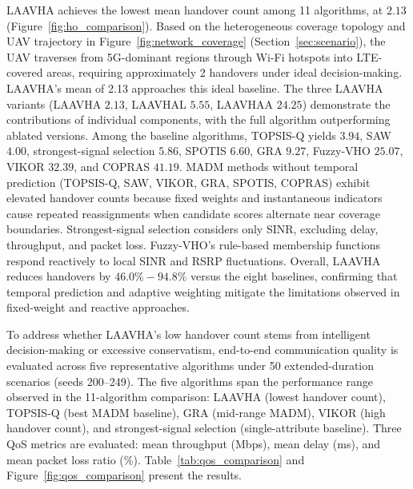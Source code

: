 \documentclass[preprint,12pt]{elsarticle}
\begin{document}
LAAVHA achieves the lowest mean handover count among 11 algorithms, at $2.13$ (Figure~\ref{fig:ho_comparison}). Based on the heterogeneous coverage topology and UAV trajectory in Figure~\ref{fig:network_coverage} (Section~\ref{sec:scenario}), the UAV traverses from 5G-dominant regions through Wi-Fi hotspots into LTE-covered areas, requiring approximately 2 handovers under ideal decision-making. LAAVHA's mean of 2.13 approaches this ideal baseline. The three LAAVHA variants (LAAVHA $2.13$, LAAVHAL $5.55$, LAAVHAA $24.25$) demonstrate the contributions of individual components, with the full algorithm outperforming ablated versions. Among the baseline algorithms, TOPSIS-Q yields $3.94$, SAW $4.00$, strongest-signal selection $5.86$, SPOTIS $6.60$, GRA $9.27$, Fuzzy-VHO $25.07$, VIKOR $32.39$, and COPRAS $41.19$. MADM methods without temporal prediction (TOPSIS-Q, SAW, VIKOR, GRA, SPOTIS, COPRAS) exhibit elevated handover counts because fixed weights and instantaneous indicators cause repeated reassignments when candidate scores alternate near coverage boundaries. Strongest-signal selection considers only SINR, excluding delay, throughput, and packet loss. Fuzzy-VHO's rule-based membership functions respond reactively to local SINR and RSRP fluctuations. Overall, LAAVHA reduces handovers by $46.0\%-94.8\%$ versus the eight baselines, confirming that temporal prediction and adaptive weighting mitigate the limitations observed in fixed-weight and reactive approaches.

To address whether LAAVHA's low handover count stems from intelligent decision-making or excessive conservatism, end-to-end communication quality is evaluated across five representative algorithms under 50 extended-duration scenarios (seeds 200--249). The five algorithms span the performance range observed in the 11-algorithm comparison: LAAVHA (lowest handover count), TOPSIS-Q (best MADM baseline), GRA (mid-range MADM), VIKOR (high handover count), and strongest-signal selection (single-attribute baseline). Three QoS metrics are evaluated: mean throughput (Mbps), mean delay (ms), and mean packet loss ratio (\%). Table~\ref{tab:qos_comparison} and Figure~\ref{fig:qos_comparison} present the results.
\end{document}
